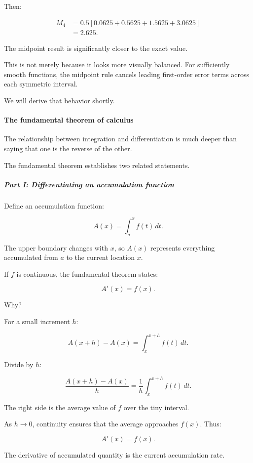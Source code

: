 Then:

\[
\begin{aligned} M_4 &=0.5[0.0625+0.5625+1.5625+3.0625]\\ &=\boxed{2.625}. \end{aligned}
\]

The midpoint result is significantly closer to the exact value.

This is not merely because it looks more visually balanced. For sufficiently smooth functions, the midpoint rule cancels leading first-order error terms across each symmetric interval.

We will derive that behavior shortly.

\paragraph{The fundamental theorem of calculus}\label{the-fundamental-theorem-of-calculus}

The relationship between integration and differentiation is much deeper than saying that one is the reverse of the other.

The fundamental theorem establishes two related statements.

\subparagraph{Part I: Differentiating an accumulation function}\label{part-i-differentiating-an-accumulation-function}

Define an accumulation function:

\[
A(x)=\int_a^x f(t)\,dt.
\]

The upper boundary changes with \(x\), so \(A(x)\) represents everything accumulated from \(a\) to the current location \(x\).

If \(f\) is continuous, the fundamental theorem states:

\[
\boxed{A'(x)=f(x)}.
\]

Why?

For a small increment \(h\):

\[
A(x+h)-A(x)=\int_x^{x+h}f(t)\,dt.
\]

Divide by \(h\):

\[
\frac{A(x+h)-A(x)}h = \frac1h\int_x^{x+h}f(t)\,dt.
\]

The right side is the average value of \(f\) over the tiny interval.

As \(h\to0\), continuity ensures that the average approaches \(f(x)\). Thus:

\[
A'(x)=f(x).
\]

The derivative of accumulated quantity is the current accumulation rate.

